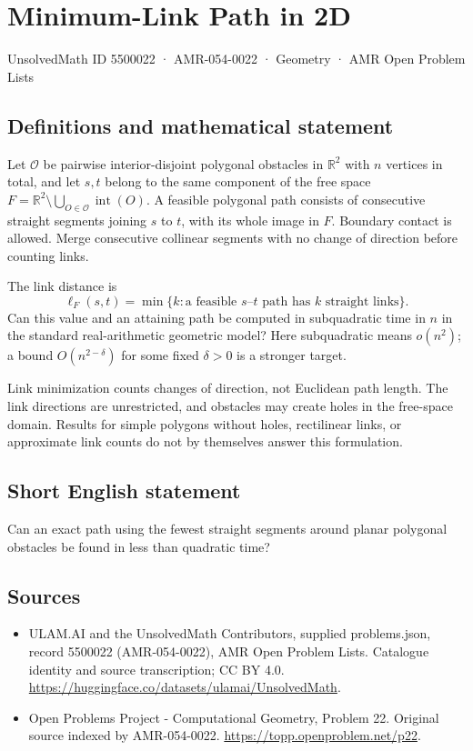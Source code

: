 \documentclass[11pt,a4paper]{article}
\begin{document}
\section*{Minimum-Link Path in 2D}\label{5500022}
{\small UnsolvedMath ID 5500022 · AMR-054-0022 · Geometry · AMR Open Problem Lists}
\subsection{Definitions and mathematical statement}
Let $\mathcal O$ be pairwise interior-disjoint polygonal obstacles in
$\mathbb R^2$ with $n$ vertices in total, and let $s,t$ belong to the
same component of the free space
$F=\mathbb R^2\setminus\bigcup_{O\in\mathcal O}\operatorname{int}(O)$.
A feasible polygonal path consists of consecutive straight segments
joining $s$ to $t$, with its whole image in $F$. Boundary contact is
allowed. Merge consecutive collinear segments with no change of
direction before counting links.

The link distance is
\[
 \ell_F(s,t)=\min\{k: \text{a feasible }s\text{--}t\text{ path has }k
                         \text{ straight links}\}.
\]
Can this value and an attaining path be computed in subquadratic time
in $n$ in the standard real-arithmetic geometric model? Here
subquadratic means $o(n^2)$; a bound $O(n^{2-\delta})$ for some fixed
$\delta>0$ is a stronger target.

Link minimization counts changes of direction, not Euclidean path
length. The link directions are unrestricted, and obstacles may create
holes in the free-space domain. Results for simple polygons without
holes, rectilinear links, or approximate link counts do not by themselves
answer this formulation.
\subsection{Short English statement}
Can an exact path using the fewest straight segments around planar
polygonal obstacles be found in less than quadratic time?
\subsection{Sources}
\begin{itemize}
\item[S1] ULAM.AI and the UnsolvedMath Contributors, supplied problems.json, record 5500022 (AMR-054-0022), AMR Open Problem Lists. Catalogue identity and source transcription; CC BY 4.0.
\url{https://huggingface.co/datasets/ulamai/UnsolvedMath}.
\item[S2] Open Problems Project - Computational Geometry, Problem 22. Original source indexed by AMR-054-0022.
\url{https://topp.openproblem.net/p22}.
\end{itemize}
\end{document}
